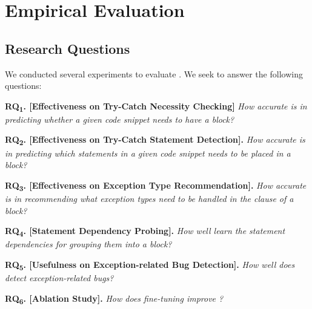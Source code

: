 \section{Empirical Evaluation}
\label{sec:eval}

\subsection{Research Questions}

We conducted several experiments to evaluate {\tool}. We seek to
answer the following questions:

\vspace{2pt}

\noindent \textbf{RQ\textsubscript{1}. [Effectiveness on Try-Catch
    Necessity Checking]} {\em How accurate is {\tool} in predicting
  whether a given code snippet needs to have a 
  block?}
    


\vspace{2pt}
\noindent \textbf{RQ\textsubscript{2}. [Effectiveness on Try-Catch
    Statement Detection].} {\em How accurate is {\tool} in predicting
  which statements in a given code snippet needs to be placed in a
   block?}


\vspace{2pt}
\noindent \textbf{RQ\textsubscript{3}. [Effectiveness on Exception Type Recommendation].}
{\em How accurate is {\tool} in recommending what exception types need to be handled in the  clause of a  block?}

\vspace{2pt}
\noindent \textbf{RQ\textsubscript{4}. [Statement Dependency Probing].}
{\em How well {\tool} learn the statement dependencies for grouping them into a  block?}

\vspace{2pt}
\noindent \textbf{RQ\textsubscript{5}. [Usefulness on
    Exception-related Bug Detection].}  {\em How well does {\tool}
  detect exception-related bugs?}

\vspace{2pt}
\noindent \textbf{RQ\textsubscript{6}. [Ablation Study].} {\em How does
 fine-tuning improve {\tool}?}





